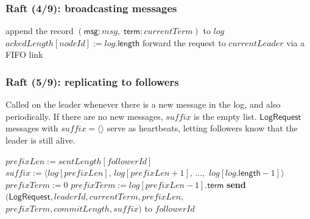 \begin{frame}
    \label{s:raft4}
    \frametitle{Raft (4/9): broadcasting messages}
    \footnotesize
    \begin{algorithmic}
        \State
                \State append the record $(\mathsf{msg}: \mathit{msg},\; \mathsf{term}: \mathit{currentTerm})$ to $\mathit{log}$
                \State $\mathit{ackedLength}[\mathit{nodeId}] := \mathit{log}.\mathsf{length}$
                    \State {}
                \EndFor
            \Else
                \State forward the request to $\mathit{currentLeader}$ via a FIFO link
            \EndIf
        \EndOn
        \State
                    \State {}
                \EndFor
            \EndIf
        \EndPeriodically
        \State
    \end{algorithmic}
\end{frame}
\label{l:raft4}

\begin{frame}
    \label{s:raft5}
    \frametitle{Raft (5/9): replicating to followers}
    \footnotesize
    Called on the leader whenever there is a new message in the log, and also periodically.
    If there are no new messages, $\mathit{suffix}$ is the empty list.
    $\mathsf{LogRequest}$ messages with $\mathit{suffix} = \langle\rangle$ serve as heartbeats, letting followers know that the leader is still alive.\\[1em]
    \begin{algorithmic}
            \State $\mathit{prefixLen} := \mathit{sentLength}[\mathit{followerId}]$
            \State $\mathit{suffix} := \langle\mathit{log}[\mathit{prefixLen}],\, \mathit{log}[\mathit{prefixLen} + 1],\, \dots,$
            \State \hspace{45pt}$\mathit{log}[\mathit{log}.\mathsf{length} - 1]\rangle$
            \State $\mathit{prefixTerm} := 0$
                \State $\mathit{prefixTerm} := \mathit{log}[\mathit{prefixLen} - 1].\mathsf{term}$
            \EndIf
            \State \textbf{send} $(\mathsf{LogRequest}, \mathit{leaderId}, \mathit{currentTerm}, \mathit{prefixLen},$
            \State \hspace{25pt}$\mathit{prefixTerm}, \mathit{commitLength}, \mathit{suffix})$ to $\mathit{followerId}$
        \EndFunction
        \State
    \end{algorithmic}
\end{frame}
\label{l:raft5}

